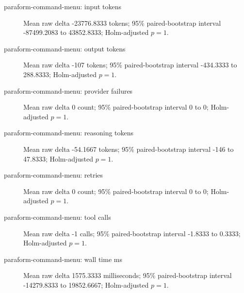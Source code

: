 \begin{description}
\item[paraform-command-menu: input tokens] Mean raw delta -23776.8333 tokens; 95\% paired-bootstrap interval -87499.2083 to 43852.8333; Holm-adjusted $p=1$.
\item[paraform-command-menu: output tokens] Mean raw delta -107 tokens; 95\% paired-bootstrap interval -434.3333 to 288.8333; Holm-adjusted $p=1$.
\item[paraform-command-menu: provider failures] Mean raw delta 0 count; 95\% paired-bootstrap interval 0 to 0; Holm-adjusted $p=1$.
\item[paraform-command-menu: reasoning tokens] Mean raw delta -54.1667 tokens; 95\% paired-bootstrap interval -146 to 47.8333; Holm-adjusted $p=1$.
\item[paraform-command-menu: retries] Mean raw delta 0 count; 95\% paired-bootstrap interval 0 to 0; Holm-adjusted $p=1$.
\item[paraform-command-menu: tool calls] Mean raw delta -1 calls; 95\% paired-bootstrap interval -1.8333 to 0.3333; Holm-adjusted $p=1$.
\item[paraform-command-menu: wall time ms] Mean raw delta 1575.3333 milliseconds; 95\% paired-bootstrap interval -14279.8333 to 19852.6667; Holm-adjusted $p=1$.
\end{description}
